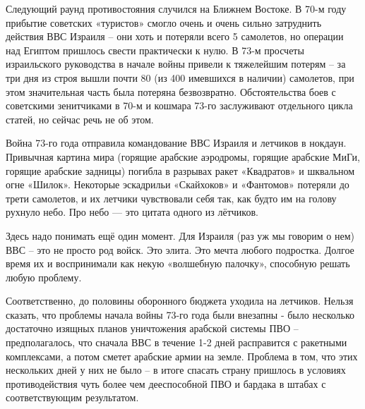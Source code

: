 Следующий раунд противостояния случился на Ближнем Востоке. В 70-м году прибытие советских «туристов» смогло очень и очень сильно затруднить действия ВВС Израиля – они хоть и потеряли всего 5 самолетов, но операции над Египтом пришлось свести практически к нулю. В 73-м просчеты израильского руководства в начале войны привели к тяжелейшим потерям – за три дня из строя вышли почти 80 (из 400 имевшихся в наличии) самолетов, при этом значительная часть была потеряна безвозвратно. Обстоятельства боев с советскими зенитчиками в 70-м и кошмара 73-го заслуживают отдельного цикла статей, но сейчас речь не об этом.

Война 73-го года отправила командование ВВС Израиля и летчиков в нокдаун. Привычная картина мира (горящие арабские аэродромы, горящие арабские МиГи, горящие арабские задницы) погибла в разрывах ракет «Квадратов» и шквальном огне «Шилок». Некоторые эскадрильи «Скайхоков» и «Фантомов» потеряли до трети самолетов, и их летчики чувствовали себя так, как будто им на голову рухнуло небо. Про небо — это цитата одного из лётчиков.

Здесь надо понимать ещё один момент. Для Израиля (раз уж мы говорим о нем) ВВС – это не просто род войск. Это элита. Это мечта любого подростка. Долгое время их и воспринимали как некую «волшебную палочку», способную решать любую проблему.

Соответственно, до половины оборонного бюджета уходила на летчиков.
Нельзя сказать, что проблемы начала войны 73-го года были внезапны - было несколько достаточно изящных планов уничтожения арабской системы ПВО – предполагалось, что сначала ВВС в течение 1-2 дней расправится с ракетными комплексами, а потом сметет арабские армии на земле. Проблема в том, что этих нескольких дней у них не было – в итоге спасать страну пришлось в условиях противодействия чуть более чем дееспособной ПВО и бардака в штабах с соответствующим результатом.

